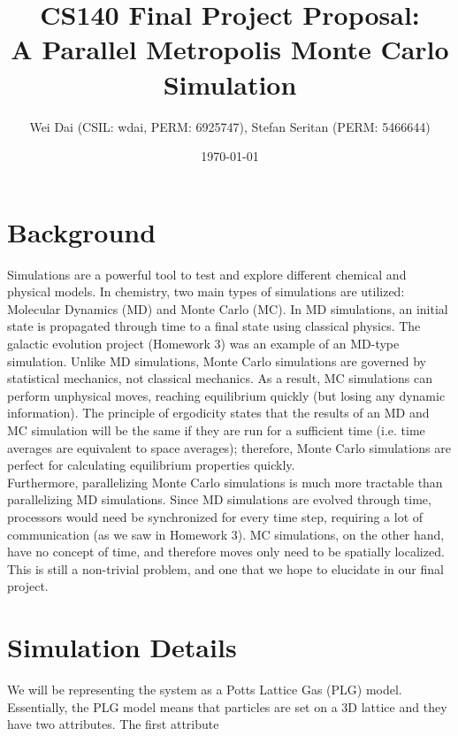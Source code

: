 \documentclass{article}
\author{Wei Dai (CSIL: wdai, PERM: 6925747), Stefan Seritan (PERM: 5466644)}
\date{\today}
\title{CS140 Final Project Proposal:\\A Parallel Metropolis Monte Carlo Simulation}
\begin{document}
\maketitle

\section*{Background}
Simulations are a powerful tool to test and explore different chemical and physical models. In chemistry, two main types of simulations are utilized: Molecular Dynamics (MD) and Monte Carlo (MC). In MD simulations, an initial state is propagated through time to a final state using classical physics. The galactic evolution project (Homework 3) was an example of an MD-type simulation. Unlike MD simulations, Monte Carlo simulations are governed by statistical mechanics, not classical mechanics. As a result, MC simulations can perform unphysical moves, reaching equilibrium quickly (but losing any dynamic information). The principle of ergodicity states that the results of an MD and MC simulation will be the same if they are run for a sufficient time (i.e. time averages are equivalent to space averages); therefore, Monte Carlo simulations are perfect for calculating equilibrium properties quickly.\\
Furthermore, parallelizing Monte Carlo simulations is much more tractable than parallelizing MD simulations. Since MD simulations are evolved through time, processors would need be synchronized for every time step, requiring a lot of communication (as we saw in Homework 3). MC simulations, on the other hand, have no concept of time, and therefore moves only need to be spatially localized. This is still a non-trivial problem, and one that we hope to elucidate in our final project.

\section*{Simulation Details}
We will be representing the system as a Potts Lattice Gas (PLG) model. Essentially, the PLG model means that particles are set on a 3D lattice and they have two attributes. The first attribute
\end{document}
